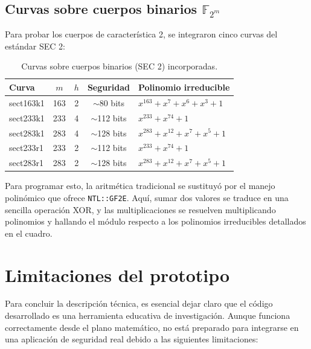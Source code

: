 \subsection{Curvas sobre cuerpos binarios $\mathbb{F}_{2^m}$}
\label{subsec:impl-curvas-binarias}

Para probar los cuerpos de característica 2, se integraron cinco curvas del estándar SEC 2:

\begin{table}[htbp]
\centering
\begin{tabular}{lcccl}
\hline
\textbf{Curva} & \textbf{$m$} & \textbf{$h$} & \textbf{Seguridad} & \textbf{Polinomio irreducible} \\
\hline
sect163k1 & 163 & 2 & $\sim$80 bits  & $x^{163} + x^7 + x^6 + x^3 + 1$ \\
sect233k1 & 233 & 4 & $\sim$112 bits & $x^{233} + x^{74} + 1$ \\
sect283k1 & 283 & 4 & $\sim$128 bits & $x^{283} + x^{12} + x^7 + x^5 + 1$ \\
sect233r1 & 233 & 2 & $\sim$112 bits & $x^{233} + x^{74} + 1$ \\
sect283r1 & 283 & 2 & $\sim$128 bits & $x^{283} + x^{12} + x^7 + x^5 + 1$ \\
\hline
\end{tabular}
\caption{Curvas sobre cuerpos binarios (SEC 2) incorporadas.}
\label{tab:curvas-binarias-impl}
\end{table}

Para programar esto, la aritmética tradicional se sustituyó por el manejo polinómico que ofrece \texttt{NTL::GF2E}. Aquí, sumar dos valores se traduce en una sencilla operación XOR, y las 
multiplicaciones se resuelven multiplicando polinomios y hallando el módulo respecto a los polinomios irreducibles detallados en el cuadro.


\section{Limitaciones del prototipo}
\label{sec:impl-limitaciones}

Para concluir la descripción técnica, es esencial dejar claro que el código desarrollado es una herramienta educativa de investigación. Aunque funciona correctamente desde el plano matemático, 
no está preparado para integrarse en una aplicación de seguridad real debido a las siguientes limitaciones:

